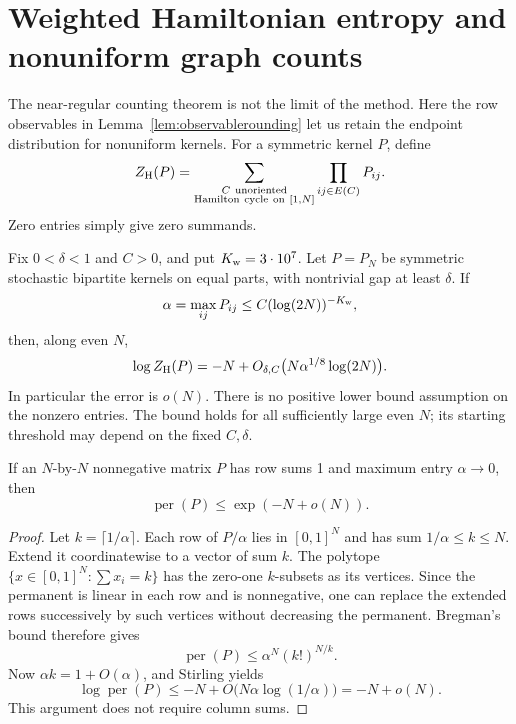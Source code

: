 \section{Weighted Hamiltonian entropy and nonuniform graph counts}
\label{sec:weightedentropy}
The near-regular counting theorem is not the limit of the method.
Here the row observables in Lemma~\ref{lem:observablerounding}
let us retain the endpoint distribution for nonuniform kernels.
For a symmetric kernel \(P\), define
\[
 Z_{\rm H}(P)=
  \sum_{\substack{C\ {\rm unoriented}\\
                   {\rm Hamilton\ cycle\ on}\ [1,N]}}
                        \prod_{ij\in E(C)}P_{ij}.
\]
Zero entries simply give zero summands.

\begin{theorem}
\label{thm:weightedentropy}
Fix \(0<\delta<1\) and \(C>0\), and put \(K_{\rm w}=3\cdot10^7\).
Let \(P=P_N\) be symmetric stochastic bipartite kernels on
equal parts, with nontrivial gap at least \(\delta\).
If
\[
 \alpha=\max_{ij}P_{ij}\leq C(\log(2N))^{-K_{\rm w}},
\]
then, along even \(N\),
\[
 \log Z_{\rm H}(P)
       =-N+O_{\delta,C}\bigl(N\alpha^{1/8}\log(2N)\bigr).
\]
In particular the error is \(o(N)\).
There is no positive lower bound assumption on the nonzero entries.
The bound holds for all sufficiently large even \(N\);
its starting threshold may depend on the fixed \(C,\delta\).
\end{theorem}

\begin{lemma}
\label{lem:diffusepermanent}
If an \(N\)-by-\(N\) nonnegative matrix \(P\) has row sums 1
and maximum entry \(\alpha\to0\), then
\[
 \operatorname{per}(P)\leq\exp(-N+o(N)).
\]
\end{lemma}
\begin{proof}
Let \(k=\lceil1/\alpha\rceil\).
Each row of \(P/\alpha\) lies in \([0,1]^N\) and has sum
\(1/\alpha\leq k\leq N\).
Extend it coordinatewise to a vector of sum \(k\).
The polytope \(\{x\in[0,1]^N:\sum x_i=k\}\) has the
zero-one \(k\)-subsets as its vertices.
Since the permanent is linear in each row and is nonnegative,
one can replace the extended rows successively by such
vertices without decreasing the permanent.
Bregman's bound therefore gives
\[
 \operatorname{per}(P)
       \leq\alpha^N(k!)^{N/k}.
\]
Now \(\alpha k=1+O(\alpha)\), and Stirling yields
\[
 \log\operatorname{per}(P)
 \leq-N+O\bigl(N\alpha\log(1/\alpha)\bigr)
 =-N+o(N).
\]
This argument does not require column sums.
\end{proof}

